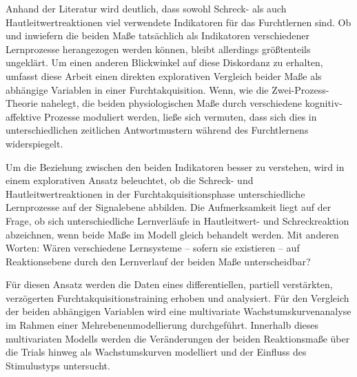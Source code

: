 

	Anhand der Literatur wird deutlich, dass sowohl Schreck- als auch Hautleitwertreaktionen viel verwendete Indikatoren für das Furchtlernen sind. Ob und inwiefern die beiden Maße tatsächlich als Indikatoren verschiedener Lernprozesse herangezogen werden können, bleibt allerdings größtenteils ungeklärt. 
	Um einen anderen Blickwinkel auf diese Diskordanz zu erhalten, umfasst diese Arbeit einen direkten explorativen Vergleich beider Maße als abhängige Variablen in einer Furchtakquisition. 
	Wenn, wie die Zwei-Prozess-Theorie nahelegt, die beiden physiologischen Maße durch verschiedene kognitiv-affektive Prozesse moduliert werden, ließe sich vermuten, dass sich dies in unterschiedlichen zeitlichen Antwortmustern während des Furchtlernens widerspiegelt. %

	Um die Beziehung zwischen den beiden Indikatoren besser zu verstehen, wird in einem explorativen Ansatz beleuchtet, ob die Schreck- und Hautleitwertreaktionen in der Furchtakquisitionsphase unterschiedliche Lernprozesse auf der Signalebene abbilden. Die Aufmerksamkeit liegt auf der Frage, ob sich unterschiedliche Lernverläufe in Hautleitwert- und Schreckreaktion abzeichnen, wenn beide Maße im Modell gleich behandelt werden. Mit anderen Worten: Wären verschiedene Lernsysteme -- sofern sie existieren -- auf Reaktionsebene durch den Lernverlauf der beiden Maße unterscheidbar?
	

	Für diesen Ansatz werden die Daten eines differentiellen, partiell verstärkten, verzögerten Furchtakquisitionstraining erhoben und analysiert.
	Für den Vergleich der beiden abhängigen Variablen wird eine multivariate Wachstumskurvenanalyse im Rahmen einer Mehrebenenmodellierung durchgeführt.
	Innerhalb dieses multivariaten Modells werden die Veränderungen der beiden Reaktionsmaße über die Trials hinweg als Wachstumskurven modelliert und der Einfluss des Stimulustyps untersucht. %
	
